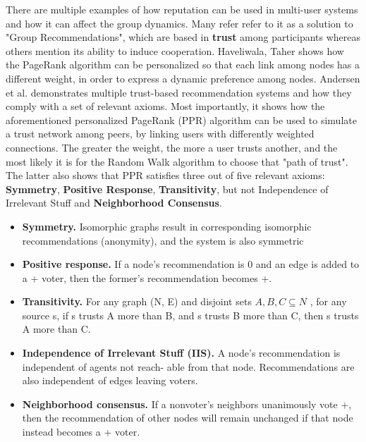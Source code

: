 There are multiple examples of how reputation can be used in multi-user systems and how it can affect the group dynamics. Many refer refer to it as a solution to "Group Recommendations", which are based in \textbf{trust} among participants whereas others mention its ability to induce cooperation. Haveliwala, Taher \cite{Haveliwala2003} shows how the PageRank algorithm can be personalized so that each link among nodes has a different weight, in order to express a dynamic preference among nodes. Andersen et al. \cite{Andersen2008} demonstrates multiple trust-based recommendation systems and how they comply with a set of relevant axioms. Most importantly, it shows how the aforementioned personalized PageRank (PPR) algorithm can be used to simulate a trust network among peers, by linking users with differently weighted connections. The greater the weight, the more a user trusts another, and the most likely it is for the Random Walk algorithm to choose that "path of trust". The latter also shows that PPR satisfies three out of five relevant axioms: \textbf{Symmetry}, \textbf{Positive Response}, \textbf{Transitivity}, but not Independence of Irrelevant Stuff and \textbf{Neighborhood Consensus}.
\begin{itemize}
    \item \textbf{Symmetry.} Isomorphic graphs result in corresponding isomorphic recommendations (anonymity), and the system is also symmetric
    \item \textbf{Positive response.} If a node’s recommendation is 0 and an edge is added to a + voter, then the former’s recommendation becomes +.
    \item \textbf{Transitivity.} For any graph (N, E) and disjoint sets $ A, B, C \subseteq N $ , for any source s, if s trusts A more than B, and s trusts B more than C, then s trusts A more than C.
    \item \textbf{Independence of Irrelevant Stuﬀ (IIS).} A node’s recommendation is independent of agents not reach- able from that node. Recommendations are also independent of edges leaving voters.
    \item \textbf{Neighborhood consensus.} If a nonvoter’s neighbors unanimously vote +, then the recommendation of other nodes will remain unchanged if that node instead becomes a + voter.
\end{itemize}

